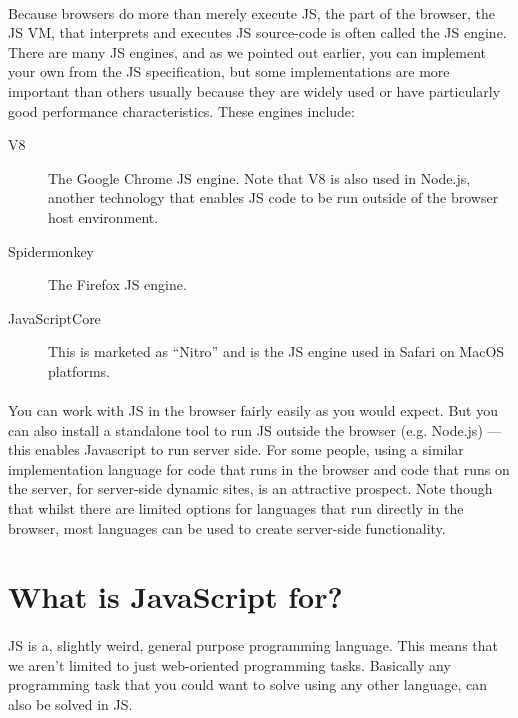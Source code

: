 \paragraph{} Because browsers do more than merely execute JS, the part of the browser, the JS VM, that interprets and executes JS source-code is often called the JS engine. There are many JS engines,  and as we pointed out earlier, you can implement your own from the JS specification, but some implementations are more important than others usually because they are widely used or have particularly good performance characteristics. These engines include:

\begin{description}
\item [V8] The Google Chrome JS engine. Note that V8 is also used in Node.js, another technology that enables JS code to be run outside of the browser host environment.
\item [Spidermonkey] The Firefox JS engine.
\item [JavaScriptCore] This is marketed as ``Nitro'' and is the JS engine used in Safari on MacOS platforms.
\end{description}

\paragraph{} You can work with JS in the browser fairly easily as you would expect. But you can also install a standalone tool to run JS outside the browser (e.g. Node.js) — this enables Javascript to run server side. For some people, using a similar implementation language for code that runs in the browser and code that runs on the server, for server-side dynamic sites, is an attractive prospect. Note though that whilst there are limited options for languages that run directly in the browser, most languages can be used to create server-side functionality.



\section{What is JavaScript for?}
\paragraph{} JS is a, slightly weird, general purpose programming language. This means that we aren't limited to just web-oriented programming tasks. Basically any programming task that you could want to solve using any other language, can also be solved in JS.
